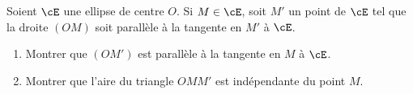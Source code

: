 \begin{enonce}
\begin{exercise}[ID={RMS 122-2 E1305 TPE PSI},subtitle={},tags={}, difficulty={0}]
Soient $\cE$ une ellipse de centre $O$.
Si $M\in\cE$, soit $M'$ un point de $\cE$ tel que la droite $\left(OM\right)$ soit parallèle à la tangente en $M'$ à $\cE$.
\begin{enumerate}
  \item Montrer que $\left( OM' \right)$ est parallèle à la tangente en $M$ à $\cE$.
  \item Montrer que l'aire du triangle $OMM'$ est indépendante du point $M$.
\end{enumerate}
\end{exercise}
\begin{solution}
\end{solution}
\end{enonce}
